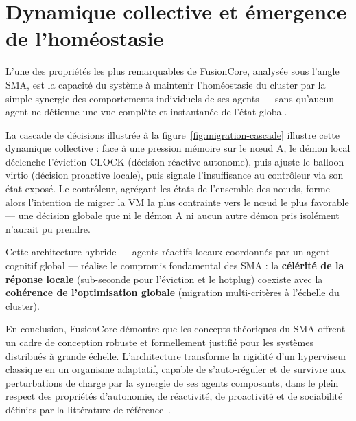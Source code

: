 \section{Dynamique collective et émergence de l'homéostasie}
\label{sec:sma-emergence}

L'une des propriétés les plus remarquables de FusionCore, analysée sous l'angle SMA, est la capacité du système à maintenir l'homéostasie du cluster par la simple synergie des comportements individuels de ses agents — sans qu'aucun agent ne détienne une vue complète et instantanée de l'état global.

La cascade de décisions illustrée à la figure~\ref{fig:migration-cascade} illustre cette dynamique collective : face à une pression mémoire sur le nœud A, le démon local déclenche l'éviction CLOCK (décision réactive autonome), puis ajuste le balloon virtio (décision proactive locale), puis signale l'insuffisance au contrôleur via son état exposé. Le contrôleur, agrégant les états de l'ensemble des nœuds, forme alors l'intention de migrer la VM la plus contrainte vers le nœud le plus favorable — une décision globale que ni le démon A ni aucun autre démon pris isolément n'aurait pu prendre.

Cette architecture hybride — agents réactifs locaux coordonnés par un agent cognitif global — réalise le compromis fondamental des SMA : la \textbf{célérité de la réponse locale} (sub-seconde pour l'éviction et le hotplug) coexiste avec la \textbf{cohérence de l'optimisation globale} (migration multi-critères à l'échelle du cluster).

En conclusion, FusionCore démontre que les concepts théoriques du SMA offrent un cadre de conception robuste et formellement justifié pour les systèmes distribués à grande échelle. L'architecture transforme la rigidité d'un hyperviseur classique en un organisme adaptatif, capable de s'auto-réguler et de survivre aux perturbations de charge par la synergie de ses agents composants, dans le plein respect des propriétés d'autonomie, de réactivité, de proactivité et de sociabilité définies par la littérature de référence~\cite{wooldridge_2002_sma,ferber_1995_sma}.
